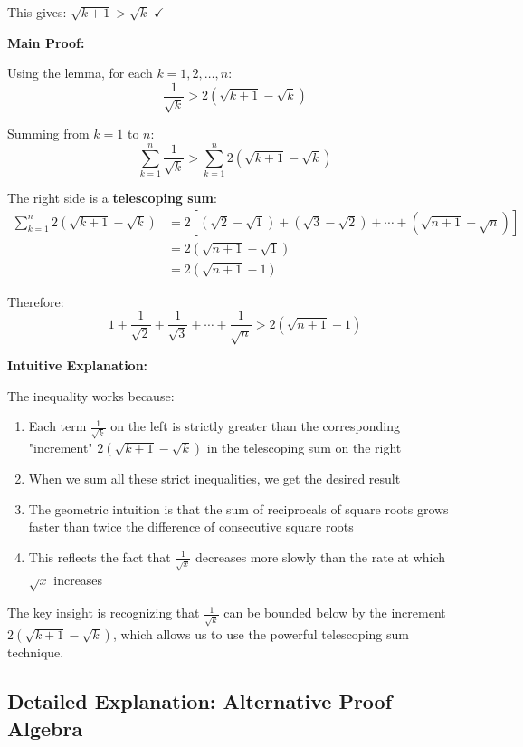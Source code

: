 \documentclass[12pt,a4paper]{article}
\theoremstyle{definition}
\theoremstyle{remark}
\begin{document}
This gives: $\sqrt{k+1} > \sqrt{k}$ $\checkmark$

\textbf{Main Proof:}

Using the lemma, for each $k = 1, 2, \ldots, n$:
$$\frac{1}{\sqrt{k}} > 2(\sqrt{k+1} - \sqrt{k})$$

Summing from $k = 1$ to $n$:
$$\sum_{k=1}^n \frac{1}{\sqrt{k}} > \sum_{k=1}^n 2(\sqrt{k+1} - \sqrt{k})$$

The right side is a \textbf{telescoping sum}:
\begin{align}
\sum_{k=1}^n 2(\sqrt{k+1} - \sqrt{k}) &= 2[(\sqrt{2} - \sqrt{1}) + (\sqrt{3} - \sqrt{2}) + \cdots + (\sqrt{n+1} - \sqrt{n})]\\
&= 2(\sqrt{n+1} - \sqrt{1})\\
&= 2(\sqrt{n+1} - 1)
\end{align}

Therefore:
$$1 + \frac{1}{\sqrt{2}} + \frac{1}{\sqrt{3}} + \cdots + \frac{1}{\sqrt{n}} > 2(\sqrt{n+1} - 1)$$

\textbf{Intuitive Explanation:}

The inequality works because:

\begin{enumerate}
\item Each term $\frac{1}{\sqrt{k}}$ on the left is strictly greater than the corresponding "increment" $2(\sqrt{k+1} - \sqrt{k})$ in the telescoping sum on the right

\item When we sum all these strict inequalities, we get the desired result

\item The geometric intuition is that the sum of reciprocals of square roots grows faster than twice the difference of consecutive square roots

\item This reflects the fact that $\frac{1}{\sqrt{x}}$ decreases more slowly than the rate at which $\sqrt{x}$ increases
\end{enumerate}

The key insight is recognizing that $\frac{1}{\sqrt{k}}$ can be bounded below by the increment $2(\sqrt{k+1} - \sqrt{k})$, which allows us to use the powerful telescoping sum technique.

\subsection*{Detailed Explanation: Alternative Proof Algebra}
\end{document}
